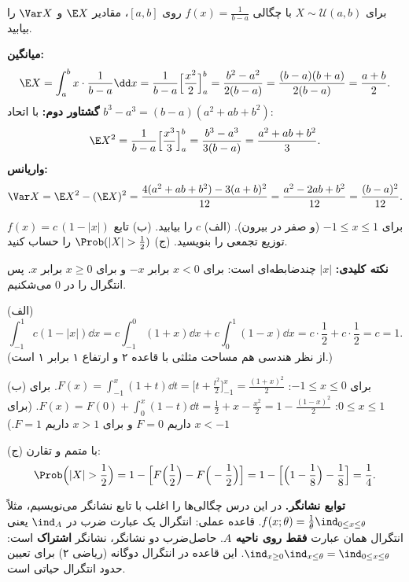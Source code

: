 \begin{example}
برای $X\sim\mathcal U(a,b)$ با چگالی $f(x)=\frac{1}{b-a}$ روی $[a,b]$، مقادیر $\E X$ و $\Var X$ را بیابید.
\begin{solution}
\textbf{میانگین:}
\[
\E X=\int_a^bx\cdot\frac{1}{b-a}\dd x=\frac{1}{b-a}\Big[\frac{x^2}{2}\Big]_a^b=\frac{b^2-a^2}{2(b-a)}=\frac{(b-a)(b+a)}{2(b-a)}=\frac{a+b}{2}.
\]
\textbf{گشتاور دوم:} با اتحاد $b^3-a^3=(b-a)(a^2+ab+b^2)$:
\[
\E X^2=\frac{1}{b-a}\Big[\frac{x^3}{3}\Big]_a^b=\frac{b^3-a^3}{3(b-a)}=\frac{a^2+ab+b^2}{3}.
\]
\textbf{واریانس:}
\[
\Var X=\E X^2-(\E X)^2=\frac{4(a^2+ab+b^2)-3(a+b)^2}{12}=\frac{a^2-2ab+b^2}{12}=\frac{(b-a)^2}{12}.
\]
\end{solution}
\end{example}

\begin{example}
$f(x)=c\,(1-|x|)$ برای $-1\le x\le1$ (و صفر در بیرون). (الف) $c$ را بیابید. (ب) تابع توزیع تجمعی را بنویسید. (ج) $\Prob(|X|>\frac12)$ را حساب کنید.
\begin{solution}
\textbf{نکته کلیدی:} $|x|$ چندضابطه‌ای است: برای $x<0$ برابر $-x$ و برای $x\ge0$ برابر $x$. پس انتگرال را در $0$ می‌شکنیم.

(الف)
\[
\int_{-1}^1c(1-|x|)\dd x=c\int_{-1}^0(1+x)\dd x+c\int_0^1(1-x)\dd x=c\cdot\frac12+c\cdot\frac12=c=1 .
\]
(از نظر هندسی هم مساحت مثلثی با قاعده ۲ و ارتفاع ۱ برابر ۱ است.)

(ب) برای $-1\le x\le0$: $F(x)=\int_{-1}^x(1+t)\dd t=\Big[t+\frac{t^2}{2}\Big]_{-1}^x=\frac{(1+x)^2}{2}$.
برای $0\le x\le1$: $F(x)=F(0)+\int_0^x(1-t)\dd t=\frac12+x-\frac{x^2}{2}=1-\frac{(1-x)^2}{2}$.
(برای $x<-1$ داریم $F=0$ و برای $x>1$ داریم $F=1$.)

(ج) با متمم و تقارن:
\[
\Prob\Big(|X|>\frac12\Big)=1-\Big[F\Big(\frac12\Big)-F\Big(-\frac12\Big)\Big]=1-\Big[\Big(1-\frac18\Big)-\frac18\Big]=\frac14 .
\]
\end{solution}
\end{example}

\begin{note}
\notetitle \textbf{توابع نشانگر.} در این درس چگالی‌ها را اغلب با تابع نشانگر می‌نویسیم، مثلاً $f(x;\theta)=\frac1\theta\ind_{0\le x\le\theta}$. قاعده عملی: انتگرال یک عبارت ضرب در $\ind_{A}$ یعنی انتگرال همان عبارت \textbf{فقط روی ناحیه $A$}. حاصل‌ضرب دو نشانگر، نشانگر \textbf{اشتراک} است: $\ind_{x\ge0}\ind_{x\le\theta}=\ind_{0\le x\le\theta}$. این قاعده در انتگرال دوگانه (ریاضی ۲) برای تعیین حدود انتگرال حیاتی است.
\end{note}

